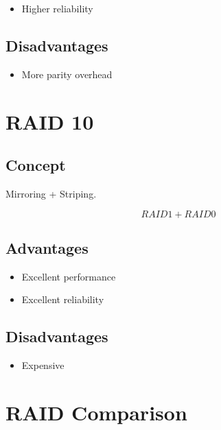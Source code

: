 \begin{itemize}
\item Higher reliability
\end{itemize}

\subsection{Disadvantages}

\begin{itemize}
\item More parity overhead
\end{itemize}

\section{RAID 10}

\subsection{Concept}

Mirroring + Striping.

\[
RAID1 + RAID0
\]

\subsection{Advantages}

\begin{itemize}
\item Excellent performance
\item Excellent reliability
\end{itemize}

\subsection{Disadvantages}

\begin{itemize}
\item Expensive
\end{itemize}

\section{RAID Comparison}

